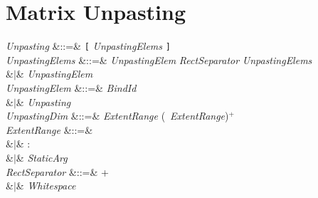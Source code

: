 %
%
%
%

\section{Matrix Unpasting}


\begin{Grammar}
\emph{Unpasting} &::=& \texttt{[} \emph{UnpastingElems} \texttt{]} \\

\emph{UnpastingElems}
&::=& \emph{UnpastingElem} \emph{RectSeparator} \emph{UnpastingElems} \\
&$|$& \emph{UnpastingElem} \\

\emph{UnpastingElem}
&::=& \emph{BindId}  \\
&$|$& \emph{Unpasting} \\

\emph{UnpastingDim} &::=& \emph{ExtentRange} (\BY\ \emph{ExtentRange})$^+$ \\

\emph{ExtentRange}
&::=& 
\\
&$|$& \KWD:\\
&$|$& \emph{StaticArg} \\

\emph{RectSeparator} &::=& \EXP{;}+\\
&$|$& \emph{Whitespace}\\
\end{Grammar}

